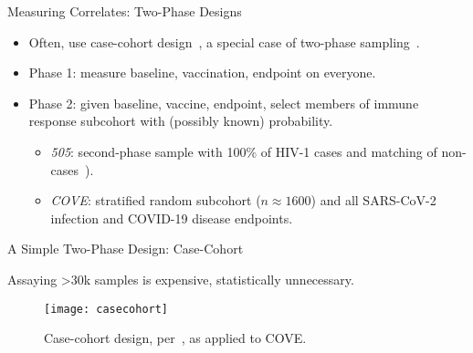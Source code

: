 \documentclass{beamer}
\begin{document}
\begin{frame}[c]{Measuring Correlates: Two-Phase Designs}

\begin{center}
\begin{itemize}
  \itemsep8pt
    \item Often, use case-cohort design~\citep{prentice1986case}, a special
      case of two-phase sampling~\citep{breslow2003large}.
    \item Phase 1: measure baseline, vaccination, endpoint on everyone.
    \item Phase 2: given baseline, vaccine, endpoint, select members of
      immune response subcohort with (possibly known) probability.
      \vspace{-1em}
      \begin{itemize}
        \itemsep4pt
        \item \textit{505}: second-phase sample with 100\% of HIV-1 cases and
          matching of non-cases~\citep[$n = 189$ per][]{janes2017higher}).
        \item \textit{COVE}: stratified random subcohort ($n \approx 1600$) and
          all SARS-CoV-2 infection and COVID-19 disease endpoints.
      \end{itemize}
\end{itemize}
\end{center}

\note{
}

\end{frame}


\begin{frame}[c]{A Simple Two-Phase Design: Case-Cohort}

Assaying >30k samples is expensive, statistically unnecessary.
\vspace{-1em}
\begin{figure}[H]
  \centering
  \texttt{[image: casecohort]}
  \captionsetup{labelformat=empty}
  \vspace{-1.5em}
  \caption{
    Case-cohort design, per~\citet{prentice1986case}, as applied to COVE.
  }
\end{figure}

\note{
}

\end{frame}

\end{document}
